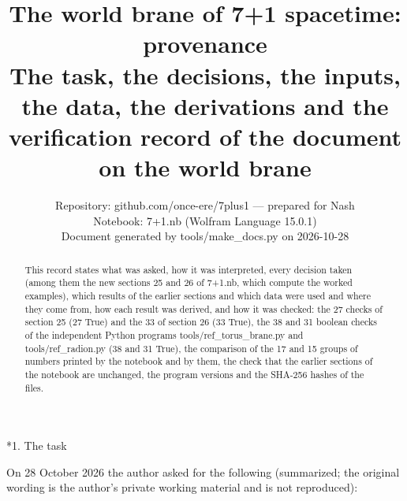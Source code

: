 \documentclass[10pt,a4paper]{article}
\makeatletter
\renewcommand\section{\@startsection{section}{1}{\z@}{-3.5ex \@plus -1ex \@minus -.2ex}{2.3ex \@plus.2ex}{\normalfont\Large\bfseries\raggedright}}
\makeatother
\begin{document}
\title{The world brane of 7+1 spacetime: provenance\\[0.4em]\large The task, the decisions, the inputs, the data, the derivations and the verification record of the document on the world brane}
\author{Repository: github.com/once-ere/7plus1 — prepared for Nash\\ Notebook: 7+1.nb (Wolfram Language 15.0.1)\\ Document generated by tools/make\_docs.py on 2026-10-28}
\date{}
\maketitle
\begin{abstract}
This record states what was asked, how it was interpreted, every decision taken (among them the new sections 25 and 26 of 7+1.nb, which compute the worked examples), which results of the earlier sections and which data were used and where they come from, how each result was derived, and how it was checked: the 27 checks of section 25 (27 True) and the 33 of section 26 (33 True), the 38 and 31 boolean checks of the independent Python programs tools/ref\_torus\_brane.py and tools/ref\_radion.py (38 and 31 True), the comparison of the 17 and 15 groups of numbers printed by the notebook and by them, the check that the earlier sections of the notebook are unchanged, the program versions and the SHA-256 hashes of the files.
\end{abstract}
\tableofcontents
{}\section*{1. The task}
On 28 October 2026 the author asked for the following (summarized; the original wording is the author’s private working material and is not reproduced):
\end{document}
